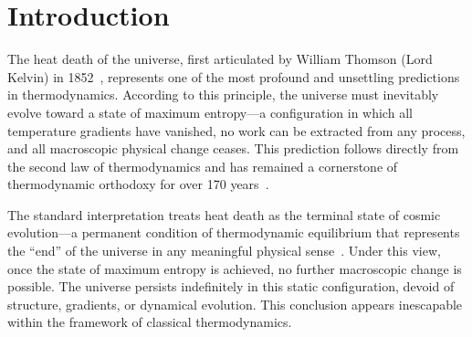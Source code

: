 \documentclass[12pt,a4paper]{article}
\theoremstyle{definition}
\theoremstyle{remark}
\begin{document}
\begin{abstract}
where observers are static windows on a moving reality and by the time any partition is complete, the partitioned content has moved, leaving an undetermined residue that accumulates as the inaccessible $x$ in the $\infty - x$ structure, and (12) nothingness is ontologically dependent on being---just as ``things that cannot happen'' only become facts when something does happen, nothingness arises only when there is something, resolving the question ``Why is there something rather than nothing?'' as malformed since nothingness cannot exist without being.

\textbf{Keywords:} Kelvin paradox, heat death, categorical completion, oscillatory cosmology, dark matter, singularity, entropy, cyclic universe, irreversibility, emergent time
\end{abstract}

\tableofcontents
\newpage

\section{Introduction}

The heat death of the universe, first articulated by William Thomson (Lord Kelvin) in 1852~\citep{thomson1852dissipation}, represents one of the most profound and unsettling predictions in thermodynamics. According to this principle, the universe must inevitably evolve toward a state of maximum entropy—a configuration in which all temperature gradients have vanished, no work can be extracted from any process, and all macroscopic physical change ceases. This prediction follows directly from the second law of thermodynamics and has remained a cornerstone of thermodynamic orthodoxy for over 170 years~\citep{clausius1865main,boltzmann1877beziehung}.

The standard interpretation treats heat death as the terminal state of cosmic evolution—a permanent condition of thermodynamic equilibrium that represents the ``end'' of the universe in any meaningful physical sense~\citep{adams1997dying,penrose2010cycles}. Under this view, once the state of maximum entropy is achieved, no further macroscopic change is possible. The universe persists indefinitely in this static configuration, devoid of structure, gradients, or dynamical evolution. This conclusion appears inescapable within the framework of classical thermodynamics.
\end{document}
